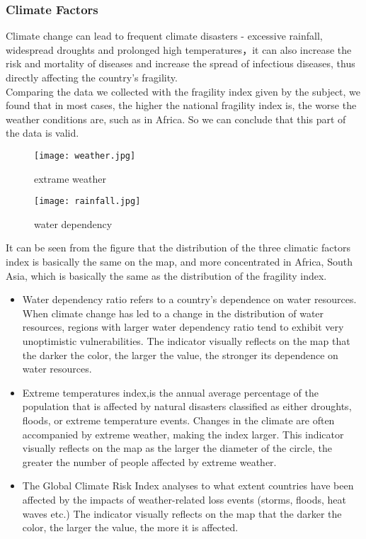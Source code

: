 \documentclass{mcmthesis}
\begin{document}
\subsubsection{Climate Factors}
Climate change can lead to frequent climate disasters - excessive rainfall, widespread droughts and prolonged high temperatures，it can also increase the risk and mortality of diseases and increase the spread of infectious diseases, thus directly affecting the country's fragility.\\
Comparing the data we collected with the fragility index given by the subject, we found that in most cases, the higher the national fragility index is, the worse the weather conditions are, such as in Africa. So we can conclude that this part of the data is valid.\\
\begin{figure}[h]
  \centering
  \begin{minipage}[h]{0.48\textwidth}
  \centering
  \texttt{[image: weather.jpg]}
  \caption{extrame weather}
  \end{minipage}
  \begin{minipage}[h]{0.48\textwidth}
  \centering
  \texttt{[image: rainfall.jpg]}
  \caption{water dependency}
  \end{minipage}
\end{figure}
\newpage
It can be seen from the figure that the distribution of the three climatic factors index is basically the same on the map, and more concentrated in Africa, South Asia, which is basically the same as the distribution of the fragility index.
\begin{itemize}
  \item Water dependency ratio refers to a country's dependence on water resources. When climate change has led to a change in the distribution of water resources, regions with larger water dependency ratio tend to exhibit very unoptimistic vulnerabilities. The indicator visually reflects on the map that the darker the color, the larger the value, the stronger its dependence on water resources.
  \item Extreme temperatures index,is the annual average percentage of the population that is affected by natural disasters classified as either droughts, floods, or extreme temperature events. Changes in the climate are often accompanied by extreme weather, making the index larger. This indicator visually reflects on the map as the larger the diameter of the circle, the greater the number of people affected by extreme weather.
  \item The Global Climate Risk Index analyses to what extent countries have been affected by the impacts of weather-related loss events (storms, floods, heat waves etc.) The indicator visually reflects on the map that the darker the color, the larger the value, the more it is affected.
\end{itemize}
\end{document}
